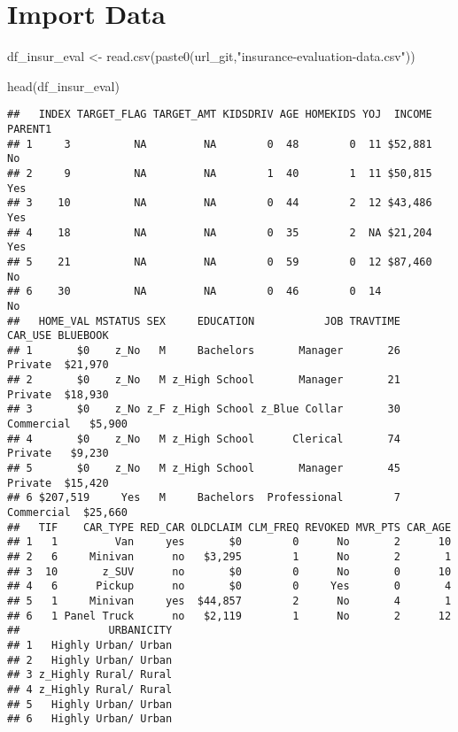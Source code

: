 \documentclass[
]{article}
\newenvironment{Shaded}{\begin{snugshade}}{\end{snugshade}}
\newcommand{\FunctionTok}[1]{\textcolor[rgb]{0.00,0.00,0.00}{#1}}
\newcommand{\NormalTok}[1]{#1}
\newcommand{\OtherTok}[1]{\textcolor[rgb]{0.56,0.35,0.01}{#1}}
\newcommand{\StringTok}[1]{\textcolor[rgb]{0.31,0.60,0.02}{#1}}
\begin{document}
\hypertarget{import-data}{%
\section{Import Data}\label{import-data}}

\begin{Shaded}
\begin{Highlighting}[]
\NormalTok{df\_insur\_eval }\OtherTok{\textless{}{-}} 
  \FunctionTok{read.csv}\NormalTok{(}\FunctionTok{paste0}\NormalTok{(url\_git,}\StringTok{"insurance{-}evaluation{-}data.csv"}\NormalTok{))}

\FunctionTok{head}\NormalTok{(df\_insur\_eval)}
\end{Highlighting}
\end{Shaded}

\begin{verbatim}
##   INDEX TARGET_FLAG TARGET_AMT KIDSDRIV AGE HOMEKIDS YOJ  INCOME PARENT1
## 1     3          NA         NA        0  48        0  11 $52,881      No
## 2     9          NA         NA        1  40        1  11 $50,815     Yes
## 3    10          NA         NA        0  44        2  12 $43,486     Yes
## 4    18          NA         NA        0  35        2  NA $21,204     Yes
## 5    21          NA         NA        0  59        0  12 $87,460      No
## 6    30          NA         NA        0  46        0  14              No
##   HOME_VAL MSTATUS SEX     EDUCATION           JOB TRAVTIME    CAR_USE BLUEBOOK
## 1       $0    z_No   M     Bachelors       Manager       26    Private  $21,970
## 2       $0    z_No   M z_High School       Manager       21    Private  $18,930
## 3       $0    z_No z_F z_High School z_Blue Collar       30 Commercial   $5,900
## 4       $0    z_No   M z_High School      Clerical       74    Private   $9,230
## 5       $0    z_No   M z_High School       Manager       45    Private  $15,420
## 6 $207,519     Yes   M     Bachelors  Professional        7 Commercial  $25,660
##   TIF    CAR_TYPE RED_CAR OLDCLAIM CLM_FREQ REVOKED MVR_PTS CAR_AGE
## 1   1         Van     yes       $0        0      No       2      10
## 2   6     Minivan      no   $3,295        1      No       2       1
## 3  10       z_SUV      no       $0        0      No       0      10
## 4   6      Pickup      no       $0        0     Yes       0       4
## 5   1     Minivan     yes  $44,857        2      No       4       1
## 6   1 Panel Truck      no   $2,119        1      No       2      12
##              URBANICITY
## 1   Highly Urban/ Urban
## 2   Highly Urban/ Urban
## 3 z_Highly Rural/ Rural
## 4 z_Highly Rural/ Rural
## 5   Highly Urban/ Urban
## 6   Highly Urban/ Urban
\end{verbatim}
\end{document}
